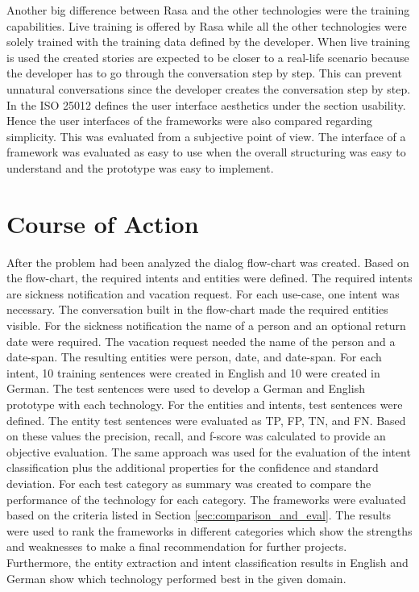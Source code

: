 Another big difference between Rasa and the other technologies were the 
training capabilities.
Live training is offered by Rasa while all the other technologies 
were solely trained with the training data defined by the developer.
When live training is used the created stories are expected to be closer 
to a real-life scenario because the developer has to go through the conversation step by step.
This can prevent unnatural conversations since the developer creates the conversation step by step.
In the ISO 25012\cite{iso25010} defines the user interface aesthetics under the section usability. 
Hence the user interfaces of the frameworks were also compared regarding simplicity.
This was evaluated from a subjective point of view.
The interface of a framework was evaluated as easy to use when the overall structuring was easy to understand and the prototype was easy to implement.


\section{Course of Action} %
After the problem had been analyzed the dialog flow-chart was 
created.
Based on the flow-chart, the required intents and entities were defined.
The required intents are sickness notification and vacation request.
For each use-case, one intent was necessary.
The conversation built in the flow-chart made the required entities visible.
For the sickness notification the name of a person and an optional 
return date were required.
The vacation request needed the name of the person and a date-span.
The resulting entities were person, date, and date-span.
For each intent, 10 training sentences were created in English and 
10 were created in German.
The test sentences were used to develop a German and English prototype 
with each technology.
For the entities and intents, test sentences were defined.
The entity test sentences were evaluated as TP, FP, TN, and FN.
Based on these values the precision, recall, and f-score was calculated 
to provide an objective evaluation.
The same approach was used for the evaluation of the intent classification plus the additional properties for the confidence and standard deviation.
For each test category as summary was created to compare the 
performance of the technology for each category.
The frameworks were evaluated based on the criteria listed in 
Section \ref{sec:comparison_and_eval}.
The results were used to rank the frameworks in different categories 
which show the strengths and weaknesses to make a final recommendation for further projects.
Furthermore, the entity extraction and intent classification results in 
English and German show which technology performed best in the 
given domain.